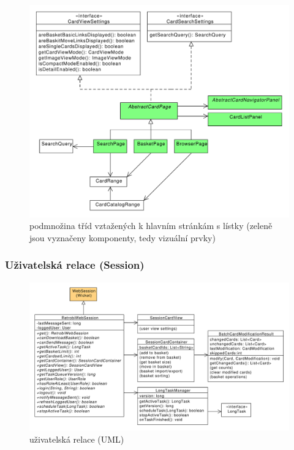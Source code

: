 \begin{figure}
\label{fig:uml_cardpage}
\centering
\includegraphics[width=\textwidth]{uml_cardpage.pdf}
\caption{podmnožina tříd vztažených k hlavním stránkám s lístky (zeleně jsou vyznačeny komponenty, tedy vizuální prvky)}
\end{figure}

\subsubsection{Uživatelská relace (Session)} 

\begin{figure}
\label{fig:uml_session}
\centering
\includegraphics[width=\textwidth]{uml_session.pdf}
\caption{uživatelská relace (UML)}
\end{figure}

